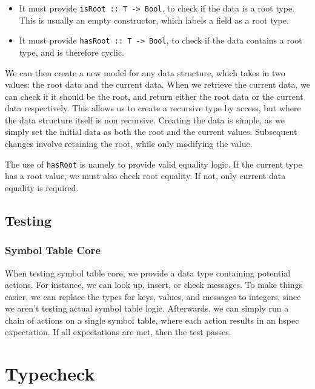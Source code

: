 \documentclass[11pt]{article}
\begin{document}
\begin{itemize}
	\item It must provide \texttt{isRoot :: T -> Bool}, to check if the data is a root type. This is usually an empty constructor, which labels a field as a root type.
	\item It must provide \texttt{hasRoot :: T -> Bool}, to check if the data contains a root type, and is therefore cyclic.
\end{itemize}

We can then create a new model for any data structure, which takes in two values: the root data and the current data.
When we retrieve the current data, we can check if it should be the root, and return either the root data or the current data respectively.
This allows us to create a recursive type by access, but where the data structure itself is non recursive.
Creating the data is simple, as we simply set the initial data as both the root and the current values.
Subsequent changes involve retaining the root, while only modifying the value.

The use of \texttt{hasRoot} is namely to provide valid equality logic.
If the current type has a root value, we must also check root equality.
If not, only current data equality is required.

\subsection{Testing} %

\subsubsection{Symbol Table Core}
\label{sec:test-symbol-table-core}

When testing symbol table core, we provide a data type containing potential actions. For instance, we can look up, insert, or check messages.
To make things easier, we can replace the types for keys, values, and messages to integers, since we aren't testing actual symbol table logic.
Afterwards, we can simply run a chain of actions on a single symbol table, where each action results in an hspec expectation. 
If all expectations are met, then the test passes.

\section{Typecheck}
\end{document}
